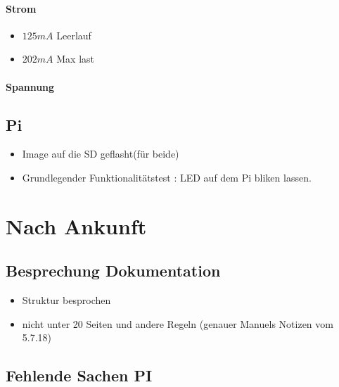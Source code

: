 \documentclass{article}
\begin{document}
\paragraph{Strom}

\begin{itemize}

\item $125 mA$ Leerlauf

\item $202 mA$ Max last

\end{itemize}

\paragraph{Spannung}



\subsection{Pi}

\begin{itemize}

\item Image auf die SD geflasht(f\"{u}r beide)

\item Grundlegender Funktionalit\"{a}tstest : LED auf dem Pi bliken lassen. 


\end{itemize}

\section{Nach Ankunft}

\subsection{Besprechung Dokumentation}

\begin{itemize}

\item Struktur besprochen

\item nicht unter 20 Seiten und andere Regeln (genauer Manuels Notizen vom 5.7.18)

\end{itemize}

\subsection{Fehlende Sachen PI}
\end{document}
